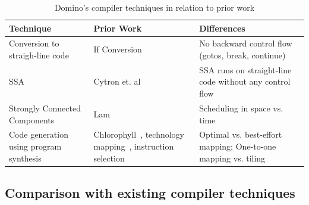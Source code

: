 \begin{table}[!t]
  \begin{scriptsize}
    \begin{tabular}{|p{}|p{}|p{}|}
  \hline
  Technique & Prior Work & Differences \\
  \hline
  Conversion to straigh-line code & If Conversion~\cite{if_conversion} & No backward control flow (gotos, break, continue) \\
  \hline
  SSA & Cytron et. al~\cite{ssa} & SSA runs on straight-line code without any control flow \\
  \hline
  Strongly Connected Components & Lam~\cite{lam} & Scheduling in space vs. time \\ %
  \hline
  Code generation using program synthesis & Chlorophyll~\cite{chlorophyll}, technology mapping~\cite{technology_mapping}, instruction selection~\cite{instruction_selection} & Optimal vs. best-effort mapping; One-to-one mapping vs. tiling \\
  \hline
  \end{tabular}
  \end{scriptsize}
  \caption{Domino's compiler techniques in relation to prior work}
  \label{tab:prior_compiler}
\end{table}

\subsection{Comparison with existing compiler techniques}

